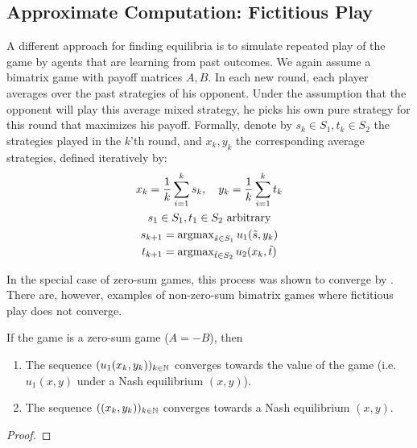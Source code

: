\documentclass[a4paper]{scrreprt}
\begin{document}
    \subsection{Approximate Computation: Fictitious Play}
    A different approach for finding equilibria is to simulate repeated play of the game by agents that are learning from past outcomes.
    We again assume a bimatrix game with payoff matrices $A, B$.
    In each new round, each player averages over the past strategies of his opponent. Under the assumption that the opponent will play this average mixed strategy, he picks his own pure strategy for this round that maximizes his payoff. Formally, denote by $s_k \in S_1, t_k \in S_2$ the strategies played in the $k$'th round, and $x_k, y_k$ the corresponding average strategies, defined iteratively by:
    \begin{gather*}
        x_k = \frac{1}{k} \sum_{i=1}^{k} s_k, \quad y_k = \frac{1}{k} \sum_{i=1}^{k} t_k \\
        s_1 \in S_1, t_1 \in S_2 \text{ arbitrary} \\
        s_{k+1} = \argmax\limits_{\tilde{s} \in S_1} u_1(\tilde{s}, y_k) \\ %
        t_{k+1} = \argmax\limits_{\tilde{t} \in S_2} u_2(x_k, \tilde{t})
    \end{gather*}
    
    In the special case of zero-sum games, this process was shown to converge by \cite{bib:robinsonFictitiousPlay}.
    There are, however, examples of non-zero-sum bimatrix games where fictitious play does not converge.
    
    \begin{thm}
        If the game is a zero-sum game ($A=-B$), then 
        \begin{enumerate}
            \item The sequence $(u_1(x_k, y_k))_{k \in \mathbb{N}}$ converges towards the value of the game (i.e. $u_1(x, y)$ under a Nash equilibrium $(x, y)$).
            \item The sequence $((x_k, y_k))_{k \in \mathbb{N}}$ converges towards a Nash equilibrium $(x, y)$.
        \end{enumerate}
    \end{thm}
    \begin{proof}
    \end{proof}
    
\end{document}

